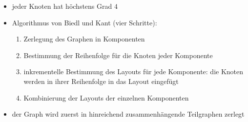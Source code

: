 \begin{itemize}[itemsep=-1pt]
	\item jeder Knoten hat höchstens Grad $4$
	\item Algorithmus von Biedl und Kant (vier Schritte):
		\begin{enumerate}
			\item Zerlegung des Graphen in Komponenten
			\item Bestimmung der Reihenfolge für die Knoten jeder Komponente
			\item inkrementelle Bestimmung des Layouts für jede Komponente: die Knoten werden in ihrer Reihenfolge in das Layout eingefügt
			\item Kombinierung der Layouts der einzelnen Komponenten
		\end{enumerate}
	\item der Graph wird zuerst in hinreichend zusammenhängende Teilgraphen zerlegt
\end{itemize}
